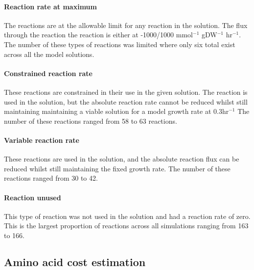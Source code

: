 \paragraph{Reaction rate at maximum}

The reactions are at the allowable limit for any reaction in the solution. The flux through the reaction the reaction is either at -1000/1000 mmol$^{-1}$ gDW$^{-1}$ hr$^{-1}$. The number of these types of reactions was limited where only six total exist across all the model solutions.

\paragraph{Constrained reaction rate}

These reactions are constrained in their use in the given solution. The reaction is used in the solution, but the absolute reaction rate cannot be reduced whilst still maintaining maintaining a viable solution for a model growth rate at 0.3hr$^{-1}$ The number of these reactions ranged from 58 to 63 reactions.

\paragraph{Variable reaction rate}

These reactions are used in the solution, and the absolute reaction flux can be reduced whilst still maintaining the fixed growth rate. The number of these reactions ranged from 30 to 42.

\paragraph{Reaction unused}

This type of reaction was not used in the solution and had a reaction rate of zero. This is the largest proportion of reactions across all simulations ranging from 163 to 166.

\subsection{Amino acid cost estimation}\label{section:amino_acid_cost_estimation}

